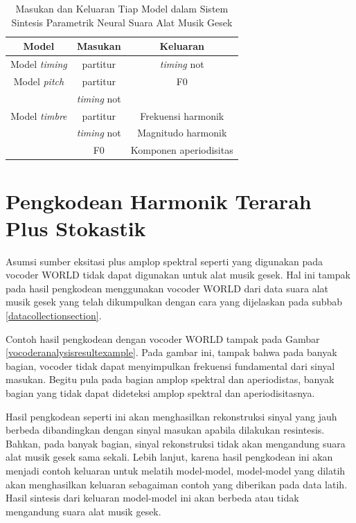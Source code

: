 \begin{table}[h]
    \centering
    \caption{Masukan dan Keluaran Tiap Model dalam Sistem Sintesis Parametrik Neural Suara Alat Musik Gesek }\label{tab-models-in-out}
    \begin{tabular}{ |c|c|c| } 
     \hline
     Model & Masukan & Keluaran \\
     \hline 
     Model \textit{timing} & partitur & \textit{timing} not  \\ 
     \hline
     Model \textit{pitch} & partitur & F0 \\ 
      & \textit{timing} not  & \\ 
     \hline
     Model \textit{timbre} & partitur   & Frekuensi harmonik \\ 
     & \textit{timing} not & Magnitudo harmonik\\
      & F0 & Komponen aperiodisitas\\ 
     \hline
    \end{tabular}
\end{table}

\section{Pengkodean Harmonik Terarah Plus Stokastik}

Asumsi sumber eksitasi plus amplop spektral seperti yang digunakan pada vocoder WORLD tidak dapat digunakan untuk alat musik gesek. Hal ini tampak pada hasil pengkodean menggunakan vocoder WORLD dari data suara alat musik gesek yang telah dikumpulkan dengan cara yang dijelaskan pada subbab \ref{datacollectionsection}.

Contoh hasil pengkodean dengan vocoder WORLD tampak pada Gambar \ref{vocoderanalysisresultexample}. Pada gambar ini, tampak bahwa pada banyak bagian, vocoder tidak dapat menyimpulkan frekuensi fundamental dari sinyal masukan. Begitu pula pada bagian amplop spektral dan aperiodistas, banyak bagian yang tidak dapat dideteksi amplop spektral dan aperiodisitasnya.

Hasil pengkodean seperti ini akan menghasilkan rekonstruksi sinyal yang jauh berbeda dibandingkan dengan sinyal masukan apabila dilakukan resintesis. Bahkan, pada banyak bagian, sinyal rekonstruksi tidak akan mengandung suara alat musik gesek sama sekali. Lebih lanjut, karena hasil pengkodean ini akan menjadi contoh keluaran untuk melatih model-model, model-model yang dilatih akan menghasilkan keluaran sebagaiman contoh yang diberikan pada data latih. Hasil sintesis dari keluaran model-model ini akan berbeda atau tidak mengandung suara alat musik gesek.


